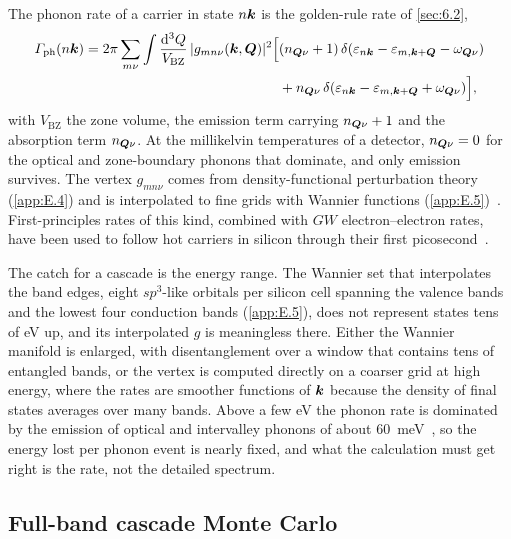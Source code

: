 The phonon rate of a carrier in state $n\bm{k}$ is the golden-rule rate of \cref{sec:6.2},
\begin{equation}
  \begin{split}
  \varGamma_{\mathrm{ph}}(n\bm{k}) = 2\pi\sum_{m\nu}\int\frac{\mathrm{d}^3Q}{V_{\mathrm{BZ}}}\,|g_{mn\nu}(\bm{k}, \bm{Q})|^2
  \Bigl[&(n_{\bm{Q}\nu} + 1)\,\delta(\varepsilon_{n\bm{k}} - \varepsilon_{m,\bm{k}+\bm{Q}} - \omega_{\bm{Q}\nu})\\ &+ n_{\bm{Q}\nu}\,\delta(\varepsilon_{n\bm{k}} - \varepsilon_{m,\bm{k}+\bm{Q}} + \omega_{\bm{Q}\nu})\Bigr],
  \end{split}
  \label{eq:E.13-gph}
\end{equation}
with $V_{\mathrm{BZ}}$ the zone volume, the emission term carrying $n_{\bm{Q}\nu} + 1$ and the absorption term $n_{\bm{Q}\nu}$. At the millikelvin temperatures of a detector, $n_{\bm{Q}\nu} = 0$ for the optical and zone-boundary phonons that dominate, and only emission survives. The vertex $g_{mn\nu}$ comes from density-functional perturbation theory (\cref{app:E.4}) and is interpolated to fine grids with Wannier functions (\cref{app:E.5})~\cite{ponce2016epw,giustino2017electron}. First-principles rates of this kind, combined with $GW$ electron--electron rates, have been used to follow hot carriers in silicon through their first picosecond~\cite{bernardi2014ab}.

The catch for a cascade is the energy range. The Wannier set that interpolates the band edges, eight $sp^3$-like orbitals per silicon cell spanning the valence bands and the lowest four conduction bands (\cref{app:E.5}), does not represent states tens of eV up, and its interpolated $g$ is meaningless there. Either the Wannier manifold is enlarged, with disentanglement over a window that contains tens of entangled bands, or the vertex is computed directly on a coarser grid at high energy, where the rates are smoother functions of $\bm{k}$ because the density of final states averages over many bands. Above a few eV the phonon rate is dominated by the emission of optical and intervalley phonons of about \SI{60}{meV}~\cite[Sect.~II\,B]{ramanathan2020ionization}, so the energy lost per phonon event is nearly fixed, and what the calculation must get right is the rate, not the detailed spectrum.

\subsection{Full-band cascade Monte Carlo}

